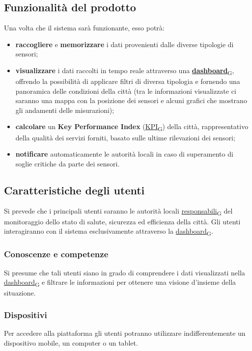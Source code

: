 \subsection{Funzionalità del prodotto}
Una volta che il sistema sarà funzionante, esso potrà:
\begin{itemize}
	\item \textbf{raccogliere} e \textbf{memorizzare} i dati provenienti dalle diverse tipologie di sensori;
	\item \textbf{visualizzare} i dati raccolti in tempo reale attraverso una \href{https://7last.github.io/docs/pb/documentazione-interna/glossario\#dashboard}{\textbf{dashboard}\textsubscript{G}}, offrendo la possibilità di applicare filtri di diversa tipologia e fornendo una panoramica delle condizioni della città (tra le informazioni visualizzate ci saranno una mappa con la posizione dei sensori e alcuni grafici che mostrano gli andamenti delle misurazioni);
	\item \textbf{calcolare} un \textbf{Key Performance Index} (\href{https://7last.github.io/docs/pb/documentazione-interna/glossario\#key-performance-indicator}{KPI\textsubscript{G}}) della città, rappresentativo della qualità dei servizi forniti, basato sulle ultime rilevazioni dei sensori;
	\item \textbf{notificare} automaticamente le autorità locali in caso di superamento di soglie critiche da parte dei sensori.
\end{itemize}

\subsection{Caratteristiche degli utenti}
Si prevede che i principali utenti saranno le autorità locali \href{https://7last.github.io/docs/pb/documentazione-interna/glossario\#responsabile}{responsabili\textsubscript{G}} del monitoraggio dello stato di salute, sicurezza ed efficienza della città. Gli utenti interagiranno con il sistema esclusivamente attraverso la \href{https://7last.github.io/docs/pb/documentazione-interna/glossario\#dashboard}{dashboard\textsubscript{G}}.

\subsubsection{Conoscenze e competenze}
Si presume che tali utenti siano in grado di comprendere i dati visualizzati nella \href{https://7last.github.io/docs/pb/documentazione-interna/glossario\#dashboard}{dashboard\textsubscript{G}} e filtrare le informazioni per ottenere una visione d’insieme della situazione.

\subsubsection{Dispositivi}
Per accedere alla piattaforma gli utenti potranno utilizzare indifferentemente un dispositivo mobile, un computer o un tablet.